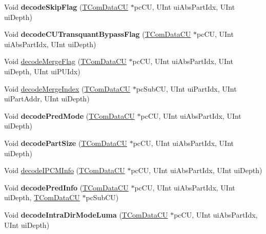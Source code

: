 \begin{DoxyCompactItemize}
Void {\bfseries decode\+Skip\+Flag} (\hyperlink{class_t_com_data_c_u}{T\+Com\+Data\+CU} $\ast$pc\+CU, U\+Int ui\+Abs\+Part\+Idx, U\+Int ui\+Depth)
\item 
\mbox{\label{class_t_dec_entropy_a7350de161d593e4b300d37bc575b21e5}} 
Void {\bfseries decode\+C\+U\+Transquant\+Bypass\+Flag} (\hyperlink{class_t_com_data_c_u}{T\+Com\+Data\+CU} $\ast$pc\+CU, U\+Int ui\+Abs\+Part\+Idx, U\+Int ui\+Depth)
\item 
Void \hyperlink{class_t_dec_entropy_ae91dd90fbd0a4312c05796d6e790cc49}{decode\+Merge\+Flag} (\hyperlink{class_t_com_data_c_u}{T\+Com\+Data\+CU} $\ast$pc\+CU, U\+Int ui\+Abs\+Part\+Idx, U\+Int ui\+Depth, U\+Int ui\+P\+U\+Idx)
\item 
Void \hyperlink{class_t_dec_entropy_a6c11bd782f37989fe46d99b910353ffb}{decode\+Merge\+Index} (\hyperlink{class_t_com_data_c_u}{T\+Com\+Data\+CU} $\ast$pc\+Sub\+CU, U\+Int ui\+Part\+Idx, U\+Int ui\+Part\+Addr, U\+Int ui\+Depth)
\item 
\mbox{\label{class_t_dec_entropy_acb82dab2b83f140424760576203ed46c}} 
Void {\bfseries decode\+Pred\+Mode} (\hyperlink{class_t_com_data_c_u}{T\+Com\+Data\+CU} $\ast$pc\+CU, U\+Int ui\+Abs\+Part\+Idx, U\+Int ui\+Depth)
\item 
\mbox{\label{class_t_dec_entropy_a6ff14935da2b853867130fb64e2004b1}} 
Void {\bfseries decode\+Part\+Size} (\hyperlink{class_t_com_data_c_u}{T\+Com\+Data\+CU} $\ast$pc\+CU, U\+Int ui\+Abs\+Part\+Idx, U\+Int ui\+Depth)
\item 
Void \hyperlink{class_t_dec_entropy_a955f7851c7ff813d54d105a0e542710c}{decode\+I\+P\+C\+M\+Info} (\hyperlink{class_t_com_data_c_u}{T\+Com\+Data\+CU} $\ast$pc\+CU, U\+Int ui\+Abs\+Part\+Idx, U\+Int ui\+Depth)
\item 
\mbox{\label{class_t_dec_entropy_ab46e52a1bc2b150ba5670dd9ed579813}} 
Void {\bfseries decode\+Pred\+Info} (\hyperlink{class_t_com_data_c_u}{T\+Com\+Data\+CU} $\ast$pc\+CU, U\+Int ui\+Abs\+Part\+Idx, U\+Int ui\+Depth, \hyperlink{class_t_com_data_c_u}{T\+Com\+Data\+CU} $\ast$pc\+Sub\+CU)
\item 
\mbox{\label{class_t_dec_entropy_aa636ca44e5f89e636854530a42444b09}} 
Void {\bfseries decode\+Intra\+Dir\+Mode\+Luma} (\hyperlink{class_t_com_data_c_u}{T\+Com\+Data\+CU} $\ast$pc\+CU, U\+Int ui\+Abs\+Part\+Idx, U\+Int ui\+Depth)

\end{DoxyCompactItemize}
